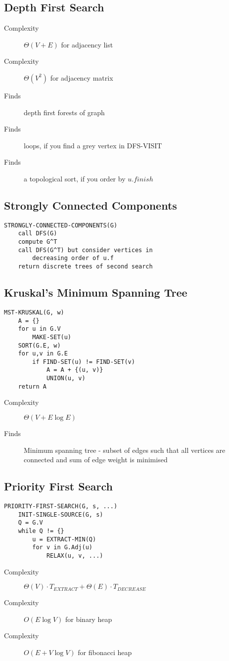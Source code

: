 \documentclass[landscape]{cheat}
\begin{document}
\begin{multicols*}{3}
\subsection{Depth First Search}
\begin{description}
    \item[Complexity] $\Theta(V+E)$ for adjacency list
    \item[Complexity] $\Theta(V^2)$ for adjacency matrix
    \item[Finds] depth first forests of graph
    \item[Finds] loops, if you find a grey vertex in DFS-VISIT
    \item[Finds] a topological sort, if you order by $u.finish$
\end{description}

\subsection{Strongly Connected Components}
\begin{lstlisting}
STRONGLY-CONNECTED-COMPONENTS(G)
    call DFS(G)
    compute G^T
    call DFS(G^T) but consider vertices in
        decreasing order of u.f
    return discrete trees of second search
\end{lstlisting}

\subsection{Kruskal's Minimum Spanning Tree}
\begin{lstlisting}
MST-KRUSKAL(G, w)
    A = {}
    for u in G.V
        MAKE-SET(u)
    SORT(G.E, w)
    for u,v in G.E
        if FIND-SET(u) != FIND-SET(v)
            A = A + {(u, v)}
            UNION(u, v)
    return A
\end{lstlisting}
\begin{description}
    \item[Complexity] $\Theta(V+E\log{E})$
    \item[Finds] Minimum spanning tree - subset of edges such that all vertices are connected and sum of edge weight is minimised
\end{description}

\subsection{Priority First Search}
\begin{lstlisting}
PRIORITY-FIRST-SEARCH(G, s, ...)
    INIT-SINGLE-SOURCE(G, s)
    Q = G.V
    while Q != {}
        u = EXTRACT-MIN(Q)
        for v in G.Adj(u)
            RELAX(u, v, ...)
\end{lstlisting}
\begin{description}
    \item[Complexity] $\Theta(V)\cdot T_{EXTRACT} + \Theta(E)\cdot T_{DECREASE}$
    \item[Complexity] $O(E\log{V})$ for binary heap
    \item[Complexity] $O(E+V\log{V})$ for fibonacci heap
\end{description}


\end{multicols*}
\end{document}
